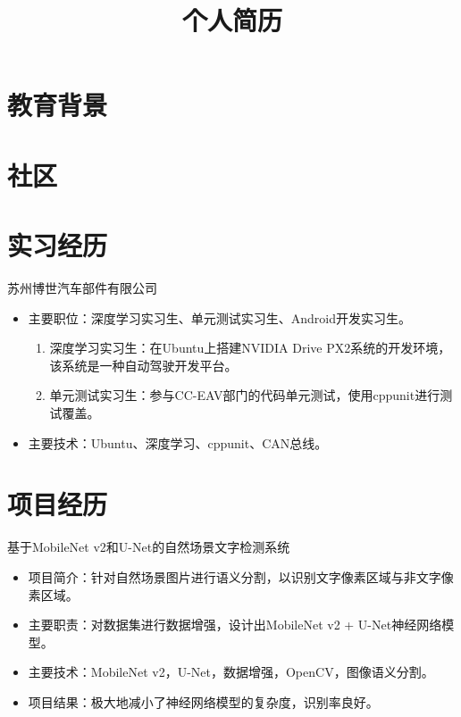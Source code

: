 \documentclass[11pt, a4paper]{moderncv}
\title{个人简历}
\begin{document}
	\maketitle
	
	\section{教育背景}

	\section{社区}
	
	\section{实习经历}
	{苏州博世汽车部件有限公司}
	{}{}{}{
		\begin{itemize}
			\item 主要职位：深度学习实习生、单元测试实习生、Android开发实习生。
			\begin{enumerate}
				\item 深度学习实习生：在Ubuntu上搭建NVIDIA Drive PX2系统的开发环境，该系统是一种自动驾驶开发平台。
				\item 单元测试实习生：参与CC-EAV部门的代码单元测试，使用cppunit进行测试覆盖。
			\end{enumerate}
			\item 主要技术：Ubuntu、深度学习、cppunit、CAN总线。
	\end{itemize}}{}	 
	
	\section{项目经历}
	{基于MobileNet v2和U-Net的自然场景文字检测系统}
	{}{}{}{
		\begin{itemize}
			\item 项目简介：针对自然场景图片进行语义分割，以识别文字像素区域与非文字像素区域。
			\item 主要职责：对数据集进行数据增强，设计出MobileNet v2 + U-Net神经网络模型。
			\item 主要技术：MobileNet v2，U-Net，数据增强，OpenCV，图像语义分割。
			\item 项目结果：极大地减小了神经网络模型的复杂度，识别率良好。
		\end{itemize}}{}	  
\end{document}
